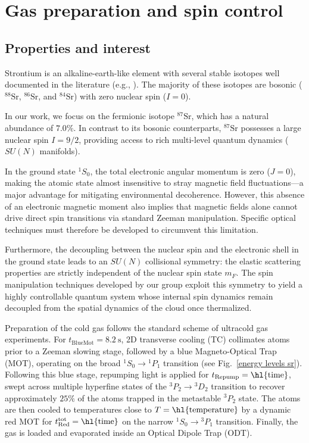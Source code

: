\begin{flushright}
\end{flushright}\chapter{Gas preparation and spin control}

\section{ Properties and interest}

Strontium is an alkaline-earth-like element with several stable isotopes well documented in the literature (e.g., \cite{reschovsky_narrow-line_2018, zelevinsky_narrow_2006, blatt_measurement_2011, borkowski_mass_2014, KillianBEC}). The majority of these isotopes are bosonic ($^{88}\text{Sr}$, $^{86}\text{Sr}$, and $^{84}\text{Sr}$) with zero nuclear spin ($I=0$). 

In our work, we focus on the fermionic isotope $^{87}\text{Sr}$, which has a natural abundance of $7.0\%$. In contrast to its bosonic counterparts, $^{87}\text{Sr}$ possesses a large nuclear spin $I=9/2$, providing access to rich multi-level quantum dynamics ($SU(N)$ manifolds).

In the ground state $^1S_0$, the total electronic angular momentum is zero ($J=0$), making the atomic state almost insensitive to stray magnetic field fluctuations—a major advantage for mitigating environmental decoherence. However, this absence of an electronic magnetic moment also implies that magnetic fields alone cannot drive direct spin transitions via standard Zeeman manipulation. Specific optical techniques must therefore be developed to circumvent this limitation.

Furthermore, the decoupling between the nuclear spin and the electronic shell in the ground state leads to an $SU(N)$ collisional symmetry: the elastic scattering properties are strictly independent of the nuclear spin state $m_F$. The spin manipulation techniques developed by our group \cite{litvinov_measuring_2021} exploit this symmetry to yield a highly controllable quantum system whose internal spin dynamics remain decoupled from the spatial dynamics of the cloud once thermalized.

Preparation of the cold gas follows the standard scheme of ultracold gas experiments.
For $t_{\text{BlueMot}} = 8.2~\text{s}$, 2D transverse cooling (TC) collimates atoms prior to a Zeeman slowing stage, followed by a blue Magneto-Optical Trap (MOT), operating on the broad $^1S_0 \rightarrow {}^1P_1$ transition (see Fig.~\ref{energy levels sr}). Following this blue stage, repumping light is applied for $t_{\text{Repump}} = \text{\hl{time}}$, swept across multiple hyperfine states of the $^3P_2 \rightarrow {}^3D_2$ transition to recover approximately $25\%$ of the atoms trapped in the metastable $^3P_2$ state. The atoms are then cooled to temperatures close to $T = \text{\hl{temperature}}$ by a dynamic red MOT for $t_{\text{Red}}^{\text{tot}} = \text{\hl{time}}$ on the narrow $^1S_0 \rightarrow {}^3P_1$ transition. Finally, the gas is loaded and evaporated inside an Optical Dipole Trap (ODT).

